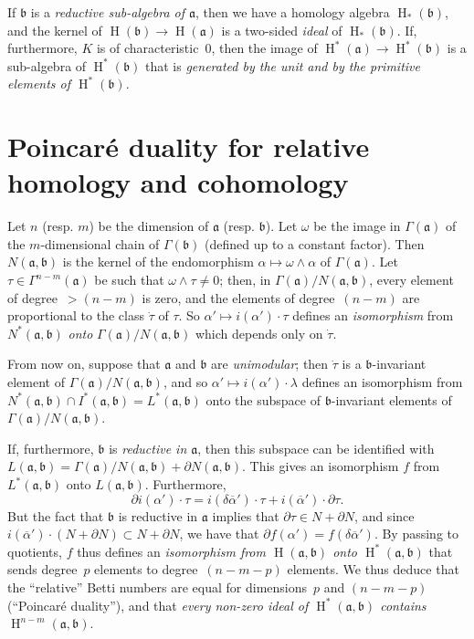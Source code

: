 \documentclass{article}
\newcommand{\fk}{\mathfrak}
\DeclareMathOperator{\HH}{H}
\newcommand{\oldpage}[1]{\marginpar{\footnotesize$\Big\vert$ \textit{p.~#1}}}
\begin{document}
If $\fk{b}$ is a \emph{reductive sub-algebra of $\fk{a}$}, then we have a homology algebra $\HH_*(\fk{b})$, and the kernel of $\HH(\fk{b})\to\HH(\fk{a})$ is a two-sided \emph{ideal} of $\HH_*(\fk{b})$.
If, furthermore, $K$ is of characteristic~$0$, then the image of $\HH^*(\fk{a})\to\HH^*(\fk{b})$ is a sub-algebra of $\HH^*(\fk{b})$ that is \emph{generated by the unit and by the primitive elements of $\HH^*(\fk{b})$}.


\section{Poincar\'{e} duality for relative homology and cohomology}
\label{III.3}

Let $n$ (resp. $m$) be the dimension of $\fk{a}$ (resp. $\fk{b}$).
Let $\omega$ be the image in $\Gamma(\fk{a})$ of the $m$-dimensional chain of $\Gamma(\fk{b})$ (defined up to a constant factor).
Then $N(\fk{a},\fk{b})$ is the kernel of the endomorphism $\alpha\mapsto\omega\wedge\alpha$ of $\Gamma(\fk{a})$.
Let $\tau\in\Gamma^{n-m}(\fk{a})$ be such that $\omega\wedge\tau\neq0$;
then, in $\Gamma(\fk{a})/N(\fk{a},\fk{b})$, every element of degree~$>(n-m)$ is zero, and the elements of degree~$(n-m)$ are proportional to the class $\dot{\tau}$ of $\tau$.
So $\alpha'\mapsto i(\alpha')\cdot\tau$ defines an \emph{isomorphism} from $N^*(\fk{a},\fk{b})$ \emph{onto} $\Gamma(\fk{a})/N(\fk{a},\fk{b})$ which depends only on $\dot{\tau}$.

From now on, suppose that $\fk{a}$ and $\fk{b}$ are \emph{unimodular};
then $\dot{\tau}$ is a $\fk{b}$-invariant element of $\Gamma(\fk{a})/N(\fk{a},\fk{b})$, and so $\alpha'\mapsto i(\alpha')\cdot\lambda$ defines an isomorphism from $N^*(\fk{a},\fk{b})\cap I^*(\fk{a},\fk{b}) = L^*(\fk{a},\fk{b})$ onto the subspace of $\fk{b}$-invariant elements of $\Gamma(\fk{a})/N(\fk{a},\fk{b})$.

If, furthermore, $\fk{b}$ is \emph{reductive in $\fk{a}$}, then this subspace can be identified with $L(\fk{a},\fk{b}) = \Gamma(\fk{a})/N(\fk{a},\fk{b})+\partial N(\fk{a},\fk{b})$.
This gives an isomorphism $f$ from $L^*(\fk{a},\fk{b})$ onto $L(\fk{a},\fk{b})$.
Furthermore,
\[
  \partial i(\alpha')\cdot\tau
  = i(\delta\overline{\alpha}')\cdot\tau + i(\overline{\alpha}')\cdot\partial\tau.
\]
But the fact that $\fk{b}$ is reductive in $\fk{a}$ implies that $\partial\tau\in N+\partial N$, and since $i(\overline{\alpha}')\cdot(N+\partial N)\subset N+\partial N$, we have that $\partial f(\alpha')=f(\delta\overline{\alpha}')$.
By passing to quotients, $f$ thus defines an \emph{isomorphism from $\HH(\fk{a},\fk{b})$ onto $\HH^*(\fk{a},\fk{b})$} that
\oldpage{74}
sends degree~$p$ elements to degree~$(n-m-p)$ elements.
We thus deduce that the ``relative'' Betti numbers are equal for dimensions~$p$ and $(n-m-p)$ (``Poincar\'{e} duality''), and that \emph{every non-zero ideal of $\HH^*(\fk{a},\fk{b})$ contains $\HH^{n-m}(\fk{a},\fk{b})$}.
\end{document}
